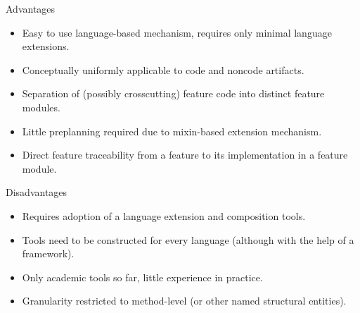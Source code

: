 \begin{frame}[label=DiscussionOfFeatureModules]{\myframetitle}
	\begin{mycolumns}
		\begin{note}{Advantages}
			\begin{itemize}
				\item Easy to use language-based mechanism, requires only minimal language extensions.
				\item Conceptually uniformly applicable to code and noncode artifacts.
				\item Separation of (possibly crosscutting) feature code into distinct feature modules.
				\item Little preplanning required due to mixin-based extension mechanism.
				\item Direct feature traceability from a feature to its implementation in a feature module.
			\end{itemize}
		\end{note}
	\mynextcolumn
		\begin{note}{Disadvantages}
			\begin{itemize}
				\item Requires adoption of a language extension and composition tools.
				\item Tools need to be constructed for every language (although with the help of a framework).
				\item Only academic tools so far, little experience in practice.
				\item Granularity restricted to method-level (or other named structural entities).
			\end{itemize}
		\end{note}
	\end{mycolumns}
\end{frame}

